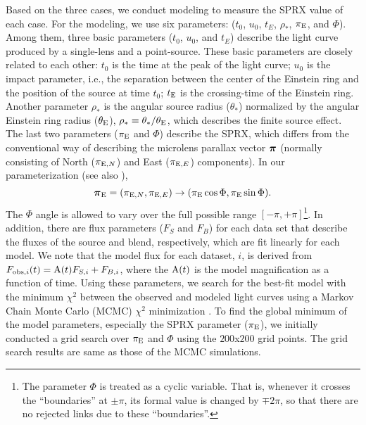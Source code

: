 \documentclass[10pt]{emulateapj}
\newcommand{\pivec}{\mbox{\boldmath $\pi$}}
\begin{document}
 Based on the three cases, we conduct modeling to measure the SPRX value of each case. For the modeling, 
we use six parameters: ($t_0$, $u_0$, $t_E$, $\rho_{\ast}$, $\pi_{\rm E}$, and 
$\Phi$). Among them, three basic parameters ($t_0$, $u_0$, and $t_E$) describe the light curve produced 
by a single-lens and a point-source. These basic parameters are closely related to each other: $t_0$ 
is the time at the peak of the light curve; $u_0$ is the impact parameter, i.e., the separation 
between the center of the Einstein ring and the position of the source at time $t_0$; $t_{\rm E}$ 
is the crossing-time of the Einstein ring. Another parameter $\rho_{\ast}$ is the angular source 
radius ($\theta_{\ast}$) normalized by the angular Einstein ring radius ($\theta_{\rm E}$), $\rho_{\ast} 
\equiv \theta_{\ast}/\theta_{\rm E}$, which describes the finite source effect. The last two parameters 
($\pi_{\rm E}$ and $\Phi$) describe the SPRX, which differs from the conventional way of describing 
the microlens parallax vector $\pivec$ (normally consisting of North ($\pi_{{\rm E},N}$) and East 
($\pi_{{\rm E},E}$) components). In our parameterization (see also \citealt{bennett08}),
\begin{equation}
\pivec_{\rm E} = (\pi_{{\rm E},N},\pi_{{\rm E},E}) \rightarrow (\pi_{\rm E}\cos\Phi,\pi_{\rm E}\sin\Phi).
\label{eqn:piereform}
\end{equation}
The $\Phi$ angle is allowed to vary over the full possible range $[-\pi, +\pi]$\footnote[2]{The parameter 
$\Phi$ is treated as a cyclic variable. That is, whenever it crosses the ``boundaries'' at $\pm \pi$, its 
formal value is changed by $\mp 2\pi$, so that there are no rejected links due to these ``boundaries''.}.
In addition, there are flux parameters ($F_{S}$ and $F_{B}$) for each data set that describe the fluxes of 
the source and blend, respectively, which are fit linearly for each model. We note that the model flux 
for each dataset, $i$, is derived from $F_{{\rm obs},i}(t)={\rm A}(t)F_{S,i}+F_{B,i}$, where the ${\rm A}(t)$ 
is the model magnification as a function of time.
Using these parameters, we search for the best-fit model with the minimum $\chi^2$ between the observed and 
modeled light curves using a Markov Chain Monte Carlo (MCMC) $\chi^2$ minimization 
\citep[the details of our MCMC sampling method are described in][]{dunkley05}. 
To find the global minimum of the model parameters, especially the SPRX parameter ($\pi_{\rm E}$), 
we initially conducted a grid search over $\pi_{\rm E}$ and $\Phi$ using the $200$x$200$ grid points. 
The grid search results are same as those of the MCMC simulations.
\end{document}
